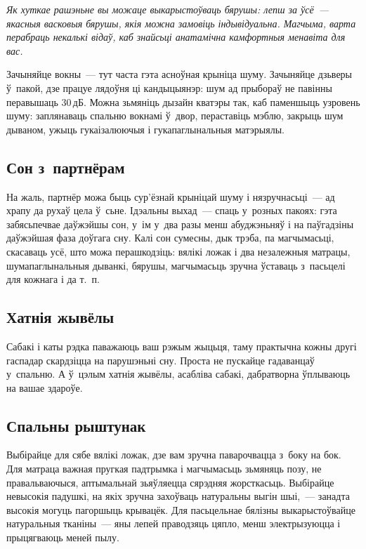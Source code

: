 \emph{Як хуткае рашэньне вы можаце выкарыстоўваць бярушы: лепш за ўсё~--- якасныя васковыя бярушы, якія можна замовіць індывідуальна. Магчыма, варта перабраць некалькі відаў, каб знайсьці анатамічна камфортныя менавіта для вас.}

Зачыняйце вокны~--- тут часта гэта асноўная крыніца шуму. Зачыняйце дзьверы ў~пакой, дзе працуе лядоўня ці кандыцыянэр: шум ад прыбораў не павінны перавышаць 30\,дБ. Можна зьмяніць дызайн кватэры так, каб паменшыць узровень шуму: заплянаваць спальню вокнамі ў~двор, пераставіць мэблю, закрыць шум дываном, ужыць гукаізалюючыя і гукапаглынальныя матэрыялы. 


\subsection*{Сон з~партнёрам}

На жаль, партнёр можа быць сур'ёзнай крыніцай шуму і нязручнасьці~--- ад храпу да рухаў цела ў~сьне. Ідэальны выхад~--- спаць у~розных пакоях: гэта забясьпечвае даўжэйшы сон, у~ім у~два разы менш абуджэньняў і на паўгадзіны даўжэйшая фаза доўгага сну. Калі сон сумесны, дык трэба, па магчымасьці, скасаваць усё, што можа перашкодзіць: вялікі ложак і два незалежныя матрацы, шумапаглынальныя дыванкі, бярушы, магчымасьць зручна ўставаць з~пасьцелі для кожнага і да т.~п.

\subsection*{Хатнія жывёлы}

Сабакі і каты рэдка паважаюць ваш рэжым жыцьця, таму практычна кожны другі гаспадар скардзіцца на парушэньні сну. Проста не пускайце гадаванцаў у~спальню. А ў~цэлым хатнія жывёлы, асабліва сабакі, дабратворна ўплываюць на вашае здароўе.

\subsection*{Спальны рыштунак}

Выбірайце для сябе вялікі ложак, дзе вам зручна паварочвацца з~боку на бок. Для матраца важная пругкая падтрымка і магчымасьць зьмяняць позу, не правальваючыся, аптымальнай зьяўляецца сярэдняя жорсткасьць. Выбірайце невысокія падушкі, на якіх зручна захоўваць натуральны выгін шыі,~--- занадта высокія могуць пагоршыць крывацёк. Для пасьцельнае бялізны выкарыстоўвайце натуральныя тканіны~--- яны лепей праводзяць цяпло, менш электрызуюцца і прыцягваюць меней пылу.

